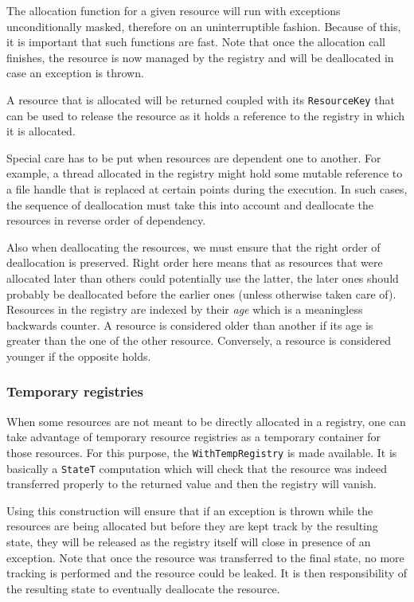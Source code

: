 The allocation function for a given resource will run with exceptions
unconditionally masked, therefore on an uninterruptible fashion. Because of
this, it is important that such functions are fast. Note that once the
allocation call finishes, the resource is now managed by the registry and will
be deallocated in case an exception is thrown.

A resource that is allocated will be returned coupled with its
\lstinline!ResourceKey! that can be used to release the resource as it holds a
reference to the registry in which it is allocated.

Special care has to be put when resources are dependent one to another. For
example, a thread allocated in the registry might hold some mutable reference to
a file handle that is replaced at certain points during the execution. In such
cases, the sequence of deallocation must take this into account and deallocate
the resources in reverse order of dependency.

Also when deallocating the resources, we must ensure that the right order of
deallocation is preserved. Right order here means that as resources that were
allocated later than others could potentially use the latter, the later ones
should probably be deallocated before the earlier ones (unless otherwise taken
care of). Resources in the registry are indexed by their \emph{age} which is a
meaningless backwards counter. A resource is considered older than another if
its age is greater than the one of the other resource. Conversely, a resource is
considered younger if the opposite holds.

\subsubsection{Temporary registries}
\label{storage:temporaryregs}

When some resources are not meant to be directly allocated in a registry, one
can take advantage of temporary resource registries as a temporary container for
those resources. For this purpose, the \lstinline!WithTempRegistry! is made
available. It is basically a \lstinline!StateT! computation which will check
that the resource was indeed transferred properly to the returned value and then
the registry will vanish.

Using this construction will ensure that if an exception is thrown while the
resources are being allocated but before they are kept track by the resulting
state, they will be released as the registry itself will close in presence of an
exception. Note that once the resource was transferred to the final state, no
more tracking is performed and the resource could be leaked. It is then
responsibility of the resulting state to eventually deallocate the resource.

